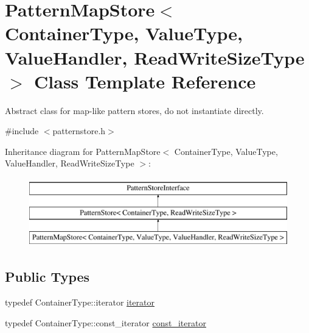 \hypertarget{classPatternMapStore}{}\section{Pattern\+Map\+Store$<$ Container\+Type, Value\+Type, Value\+Handler, Read\+Write\+Size\+Type $>$ Class Template Reference}
\label{classPatternMapStore}


Abstract class for map-\/like pattern stores, do not instantiate directly.  




{\ttfamily \#include $<$patternstore.\+h$>$}

Inheritance diagram for Pattern\+Map\+Store$<$ Container\+Type, Value\+Type, Value\+Handler, Read\+Write\+Size\+Type $>$\+:\begin{figure}[H]
\begin{center}
\leavevmode
\includegraphics[height=3.000000cm]{classPatternMapStore}
\end{center}
\end{figure}
\subsection*{Public Types}
\begin{DoxyCompactItemize}
\item 
typedef Container\+Type\+::iterator \hyperlink{classPatternMapStore_a918b5de9d2deb6fcc2080a0bb9f53877}{iterator}
\item 
typedef Container\+Type\+::const\+\_\+iterator \hyperlink{classPatternMapStore_a41a18b827340283e8a643a1d526320f4}{const\+\_\+iterator}
\end{DoxyCompactItemize}
